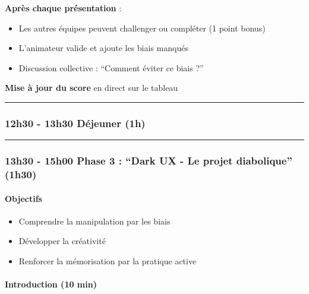 \documentclass[
]{article}
\providecommand{\tightlist}{%
  \setlength{\itemsep}{0pt}\setlength{\parskip}{0pt}}
\begin{document}
\textbf{Après chaque présentation} :

\begin{itemize}
\tightlist
\item
  Les autres équipes peuvent challenger ou compléter (1 point bonus)
\item
  L'animateur valide et ajoute les biais manqués
\item
  Discussion collective : ``Comment éviter ce biais ?''
\end{itemize}

\textbf{Mise à jour du score} en direct sur le tableau

\begin{center}\rule{0.5\linewidth}{0.5pt}\end{center}

\subsubsection{\texorpdfstring{\textbf{12h30 - 13h30 \textbar{} Déjeuner
(1h)}}{12h30 - 13h30 \textbar{} Déjeuner (1h)}}\label{h30---13h30-duxe9jeuner-1h}

\begin{center}\rule{0.5\linewidth}{0.5pt}\end{center}

\subsubsection{\texorpdfstring{\textbf{13h30 - 15h00 \textbar{} Phase 3
: ``Dark UX - Le projet diabolique''
(1h30)}}{13h30 - 15h00 \textbar{} Phase 3 : ``Dark UX - Le projet diabolique'' (1h30)}}\label{h30---15h00-phase-3-dark-ux---le-projet-diabolique-1h30}

\paragraph{Objectifs}\label{objectifs-3}

\begin{itemize}
\tightlist
\item
  Comprendre la manipulation par les biais
\item
  Développer la créativité
\item
  Renforcer la mémorisation par la pratique active
\end{itemize}

\paragraph{Introduction (10 min)}\label{introduction-10-min}
\end{document}
